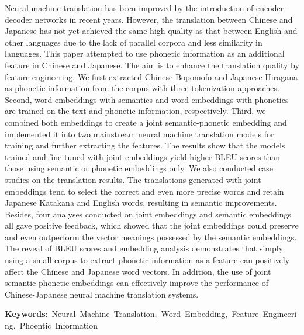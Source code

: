 Neural machine translation has been improved by the introduction of encoder-decoder networks in recent years. However, the translation between Chinese and Japanese has not yet achieved the same high quality as that between English and other languages due to the lack of parallel corpora and less similarity in languages. This paper attempted to use phonetic information as an additional feature in Chinese and Japanese. The aim is to enhance the translation quality by feature engineering. We first extracted Chinese Bopomofo and Japanese Hiragana as phonetic information from the corpus with three tokenization approaches. Second, word embeddings with semantics and word embeddings with phonetics are trained on the text and phonetic information, respectively. Third, we combined both embeddings to create a joint semantic-phonetic embedding and implemented it into two mainstream neural machine translation models for training and further extracting the features. The results show that the models trained and fine-tuned with joint embeddings yield higher BLEU scores than those using semantic or phonetic embeddings only. We also conducted case studies on the translation results. The translations generated with joint embeddings tend to select the correct and even more precise words and retain Japanese Katakana and English words, resulting in semantic improvements. Besides, four analyses conducted on joint embeddings and semantic embeddings all gave positive feedback, which showed that the joint embeddings could preserve and even outperform the vector meanings possessed by the semantic embeddings. The reveal of BLEU scores and embedding analysis demonstrates that simply using a small corpus to extract phonetic information as a feature can positively affect the Chinese and Japanese word vectors. In addition, the use of joint semantic-phonetic embeddings can effectively improve the performance of Chinese-Japanese neural machine translation systems.

\begin{flushleft}
\mbox{{\bf Keywords}: Neural Machine Translation, Word Embedding, Feature Engineering, Phoentic Information}
\end{flushleft}